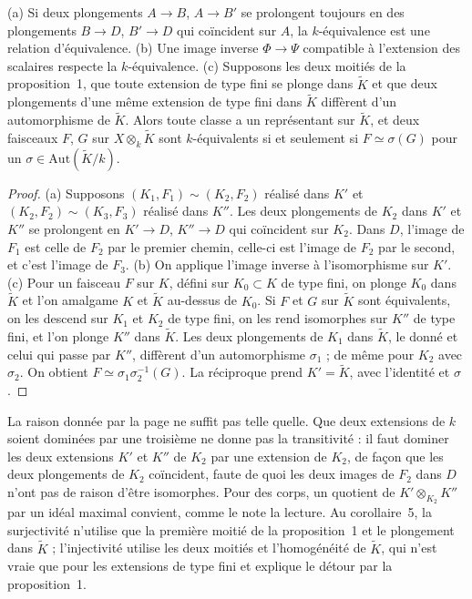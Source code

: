 \begin{encadre}
\begin{theoreme}
\textup{(a)} Si deux plongements $A \to B$, $A \to B'$ se prolongent toujours en des plongements $B \to D$, $B' \to D$ qui coïncident sur $A$, la $k$-équivalence est une relation d'équivalence. \textup{(b)} Une image inverse $\Phi \to \Psi$ compatible à l'extension des scalaires respecte la $k$-équivalence. \textup{(c)} Supposons les deux moitiés de la proposition~1, que toute extension de type fini se plonge dans $\widetilde K$ et que deux plongements d'une même extension de type fini dans $\widetilde K$ diffèrent d'un automorphisme de $\widetilde K$. Alors toute classe a un représentant sur $\widetilde K$, et deux faisceaux $F$, $G$ sur $X \otimes_k \widetilde K$ sont $k$-équivalents si et seulement si $F \simeq \sigma(G)$ pour un $\sigma \in \mathrm{Aut}(\widetilde K/k)$.
\end{theoreme}
\end{encadre}

\begin{proof}
(a) Supposons $(K_1, F_1) \sim (K_2, F_2)$ réalisé dans $K'$ et $(K_2, F_2) \sim (K_3, F_3)$ réalisé dans $K''$. Les deux plongements de $K_2$ dans $K'$ et $K''$ se prolongent en $K' \to D$, $K'' \to D$ qui coïncident sur $K_2$. Dans $D$, l'image de $F_1$ est celle de $F_2$ par le premier chemin, celle-ci est l'image de $F_2$ par le second, et c'est l'image de $F_3$. (b) On applique l'image inverse à l'isomorphisme sur $K'$. (c) Pour un faisceau $F$ sur $K$, défini sur $K_0 \subset K$ de type fini, on plonge $K_0$ dans $\widetilde K$ et l'on amalgame $K$ et $\widetilde K$ au-dessus de $K_0$. Si $F$ et $G$ sur $\widetilde K$ sont équivalents, on les descend sur $K_1$ et $K_2$ de type fini, on les rend isomorphes sur $K''$ de type fini, et l'on plonge $K''$ dans $\widetilde K$. Les deux plongements de $K_1$ dans $\widetilde K$, le donné et celui qui passe par $K''$, diffèrent d'un automorphisme $\sigma_1$ ; de même pour $K_2$ avec $\sigma_2$. On obtient $F \simeq \sigma_1 \sigma_2^{-1}(G)$. La réciproque prend $K' = \widetilde K$, avec l'identité et $\sigma$.
\end{proof}

\begin{remarque}
La raison donnée par la page ne suffit pas telle quelle. Que deux extensions de $k$ soient dominées par une troisième ne donne pas la transitivité : il faut dominer les deux extensions $K'$ et $K''$ de $K_2$ par une extension de $K_2$, de façon que les deux plongements de $K_2$ coïncident, faute de quoi les deux images de $F_2$ dans $D$ n'ont pas de raison d'être isomorphes. Pour des corps, un quotient de $K' \otimes_{K_2} K''$ par un idéal maximal convient, comme le note la lecture. Au corollaire~5, la surjectivité n'utilise que la première moitié de la proposition~1 et le plongement dans $\widetilde K$ ; l'injectivité utilise les deux moitiés et l'homogénéité de $\widetilde K$, qui n'est vraie que pour les extensions de type fini et explique le détour par la proposition~1.
\end{remarque}

